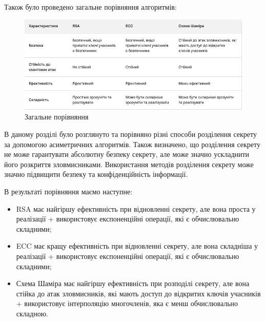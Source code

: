 Також було проведено загальне порівняння алгоритмів:

\begin{figure}[ht]
        \centering
        \includegraphics[scale=0.6]{IMAGES/compareTable.png}
        \caption{Загальне порівняння}
        \label{fig_compareTable}
\end{figure}

\chapconclude{\ref{chap:review3}}
В даному розділі було розглянуто та порівняно різні способи розділення секрету за допомогою асиметричних алгоритмів. Також визначено, що розділення секрету не може гарантувати абсолютну безпеку секрету, але може значно ускладнити його розкриття зловмисниками. Використання методів розділення секрету може значно підвищити безпеку та конфіденційність інформації.\par
В результаті порівняння маємо наступне:
\begin{itemize} [label={$\bullet$}]
    \item RSA має найгіршу ефективність при відновленні секрету, але вона проста у реалізації + використовує експоненційні операції, які є обчислювально складними;
    \item ECC має кращу ефективність при відновленні секрету, але вона складніша у реалізації + використовує експоненційні операції, які є обчислювально складними;
    \item Схема Шаміра має найгіршу ефективність при розподілі секрету, але вона стійка до атак зловмисників, які мають доступ до відкритих ключів учасників + використовує інтерполяцію многочленів, яка є менш обчислювально складною.
\end{itemize}
